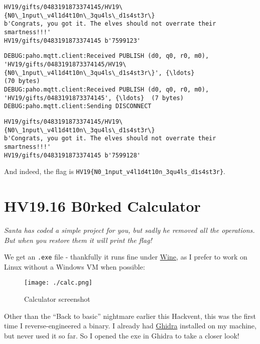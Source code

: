 \documentclass[11pt]{article}
\begin{document}
    \begin{Verbatim}[commandchars=\\\{\}]
HV19/gifts/0483191873374145/HV19\{N0\_1nput\_v4l1d4t10n\_3qu4ls\_d1s4st3r\}
b'Congrats, you got it. The elves should not overrate their smartness!!!'
HV19/gifts/0483191873374145 b'7599123'
    \end{Verbatim}

    \begin{Verbatim}[commandchars=\\\{\}]
DEBUG:paho.mqtt.client:Received PUBLISH (d0, q0, r0, m0),
'HV19/gifts/0483191873374145/HV19\{N0\_1nput\_v4l1d4t10n\_3qu4ls\_d1s4st3r\}', {\ldots}
(70 bytes)
DEBUG:paho.mqtt.client:Received PUBLISH (d0, q0, r0, m0),
'HV19/gifts/0483191873374145', {\ldots}  (7 bytes)
DEBUG:paho.mqtt.client:Sending DISCONNECT
    \end{Verbatim}

    \begin{Verbatim}[commandchars=\\\{\}]
HV19/gifts/0483191873374145/HV19\{N0\_1nput\_v4l1d4t10n\_3qu4ls\_d1s4st3r\}
b'Congrats, you got it. The elves should not overrate their smartness!!!'
HV19/gifts/0483191873374145 b'7599128'
    \end{Verbatim}

    And indeed, the flag is
\texttt{HV19\{N0\_1nput\_v4l1d4t10n\_3qu4ls\_d1s4st3r\}}.



    
\pagebreak{}
    \hypertarget{hv19.16-b0rked-calculator}{%
\section{HV19.16 B0rked Calculator}\label{hv19.16-b0rked-calculator}}

\emph{Santa has coded a simple project for you, but sadly he removed all
the operations. But when you restore them it will print the flag!}

We get an \texttt{.exe} file - thankfully it runs fine under
\href{https://www.winehq.org/}{Wine}, as I prefer to work on Linux
without a Windows VM when possible:

\begin{figure}
\centering
\texttt{[image: ./calc.png]}
\caption{Calculator screenshot}
\end{figure}

Other than the ``Back to basic'' nightmare earlier this Hackvent, this
was the first time I reverse-engineered a binary. I already had
\href{https://ghidra-sre.org/}{Ghidra} installed on my machine, but
never used it so far. So I opened the exe in Ghidra to take a closer
look!
\end{document}
